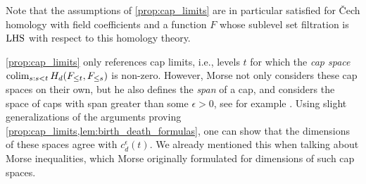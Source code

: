 \begin{rem}
	Note that the assumptions of \cref{prop:cap_limits} are in particular satisfied for \v{C}ech homology with field coefficients and a function $F$ whose sublevel set filtration is $\mathrm{LHS}$ with respect to this homology theory.

	\cref{prop:cap_limits} only references cap limits, i.e., levels $t$ for which the \emph{cap space} $\operatorname*{colim}_{s: s < t} H_{d}(F_{\leq t}, F_{\leq s})$ is non-zero.
	However, Morse not only considers these cap spaces on their own, but he also defines the \emph{span} of a cap, and considers the space of caps with span greater than some $\epsilon > 0$, see for example \cite[Section 11]{Morse.1940}.
	Using slight generalizations of the arguments proving \cref{prop:cap_limits,lem:birth_death_formulas}, one can show that the dimensions of these spaces agree with $c_{d}^{\epsilon}(t)$.
	We already mentioned this when talking about Morse inequalities, which Morse originally formulated for dimensions of such cap spaces.
\end{rem}

